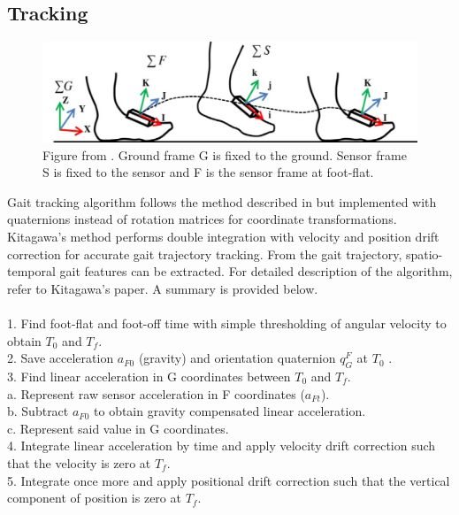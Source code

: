 \subsection{Tracking}

\begin{figure}[th]
\captionsetup{justification=raggedright,singlelinecheck=false}
\centering
\includegraphics[width=\textwidth,height=\textheight,keepaspectratio]{Figures/kitagawa.jpg}
\decoRule
\caption[Kitagawa's method]{Figure from \cite{Kit16}. Ground frame G is fixed to the ground. Sensor frame S is fixed to the sensor and F is the sensor frame at foot-flat.}
\label{fig:kitagawa}
\end{figure}
\noindent
Gait tracking algorithm follows the method described in \cite{Kit16} but implemented with quaternions instead of rotation matrices for coordinate transformations. Kitagawa's method performs double integration with velocity and position drift correction for accurate gait trajectory tracking. From the gait trajectory, spatio-temporal gait features can be extracted. For detailed description of the algorithm, refer to Kitagawa's paper. A summary is provided below. 
\\\\
1. Find foot-flat and foot-off time with simple thresholding of angular velocity to obtain $T_{0}$ and $T_{f}$.\\
2. Save acceleration $a_{F0}$ (gravity) and orientation quaternion $q^{F}_{G}$ at $T_{0}$ .\\
3. Find linear acceleration in G coordinates between $T_{0}$ and $T_{f}$.\\
\indent
a. Represent raw sensor acceleration in F coordinates ($a_{Ft}$).\\
\indent
b. Subtract $a_{F0}$ to obtain gravity compensated linear acceleration.\\
\indent
c. Represent said value in G coordinates.\\
4. Integrate linear acceleration by time and apply velocity drift correction such that the velocity is zero at $T_{f}$.\\
5. Integrate once more and apply positional drift correction such that the vertical component of position is zero at $T_{f}$.

